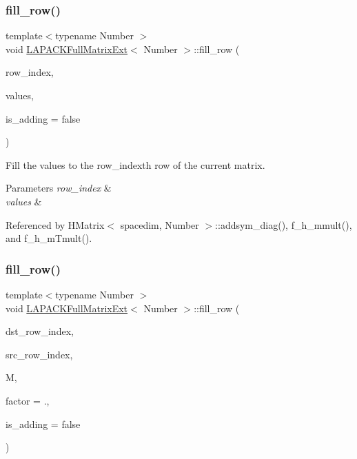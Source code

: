 \subsubsection{\texorpdfstring{fill\+\_\+row()}{fill\_row()}\hspace{0.1cm}{\footnotesize\ttfamily [1/2]}}
{\footnotesize\ttfamily template$<$typename Number $>$ \\
void \hyperlink{classLAPACKFullMatrixExt}{L\+A\+P\+A\+C\+K\+Full\+Matrix\+Ext}$<$ Number $>$\+::fill\+\_\+row (\begin{DoxyParamCaption}\item[{const \hyperlink{classLAPACKFullMatrixExt_a5cf5f4a6104dc17029210b5ca52bf574}{size\+\_\+type}}]{row\+\_\+index,  }\item[{const Vector$<$ Number $>$ \&}]{values,  }\item[{const bool}]{is\+\_\+adding = {\ttfamily false} }\end{DoxyParamCaption})}

Fill the {\ttfamily values} to the {\ttfamily row\+\_\+index\textquotesingle{}th} row of the current matrix. 
\begin{DoxyParams}{Parameters}
{\em row\+\_\+index} & \\
\hline
{\em values} & \\
\hline
\end{DoxyParams}


Referenced by H\+Matrix$<$ spacedim, Number $>$\+::addsym\+\_\+diag(), f\+\_\+h\+\_\+mmult(), and f\+\_\+h\+\_\+m\+Tmult().

\mbox{\label{classLAPACKFullMatrixExt_ad4e5746bbd700aac4a9830b8b051bbb3}} 
\subsubsection{\texorpdfstring{fill\+\_\+row()}{fill\_row()}\hspace{0.1cm}{\footnotesize\ttfamily [2/2]}}
{\footnotesize\ttfamily template$<$typename Number $>$ \\
void \hyperlink{classLAPACKFullMatrixExt}{L\+A\+P\+A\+C\+K\+Full\+Matrix\+Ext}$<$ Number $>$\+::fill\+\_\+row (\begin{DoxyParamCaption}\item[{const \hyperlink{classLAPACKFullMatrixExt_a5cf5f4a6104dc17029210b5ca52bf574}{size\+\_\+type}}]{dst\+\_\+row\+\_\+index,  }\item[{const \hyperlink{classLAPACKFullMatrixExt_a5cf5f4a6104dc17029210b5ca52bf574}{size\+\_\+type}}]{src\+\_\+row\+\_\+index,  }\item[{const \hyperlink{classLAPACKFullMatrixExt}{L\+A\+P\+A\+C\+K\+Full\+Matrix\+Ext}$<$ Number $>$ \&}]{M,  }\item[{const Number}]{factor = {.},  }\item[{const bool}]{is\+\_\+adding = {\ttfamily false} }\end{DoxyParamCaption})}

